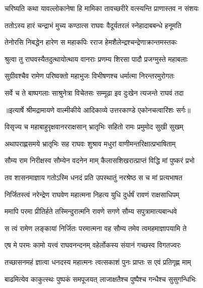 \twolineshloka
{चरिष्यति कथा यावल्लोकानेषा हि मामिका}
{तावच्छरीरे वत्स्यन्ति प्राणास्तव न संशयः} %

\twolineshloka
{ततोऽस्य हारं चन्द्राभं मुच्य कण्ठात्स राघवः}
{वैदूर्यतरलं स्नेहादाबबन्धे हनूमति} %

\twolineshloka
{तेनोरसि निबद्धेन हारेण स महाकपिः}
{रराज हेमशैलेन्द्रश्चन्द्रेणाक्रान्तमस्तकः} %

\twolineshloka
{श्रुत्वा तु राघवस्यैतदुत्थायोत्थाय वानराः}
{प्रणम्य शिरसा पादौ प्रजग्मुस्ते महाबलाः} %

\twolineshloka
{सुग्रीवश्चैव रामेण परिष्वक्तो महाभुजः}
{विभीषणश्च धर्मात्मा निरन्तरमुरोगतः} %

\twolineshloka
{सर्वे च ते बाष्पगलाः साश्रुनेत्रा विचेतसः}
{सम्मूढा इव दुःखेन त्यजन्ते राघवं तदा} %


{॥इत्यार्षे श्रीमद्रामायणे वाल्मीकीये आदिकाव्ये उत्तरकाण्डे एकोनचत्वारिंशः सर्गः॥}


\twolineshloka
{विसृज्य च महाबाहुरृक्षवानरराक्षसान्}
{भ्रातृभिः सहितो रामः प्रमुमोद सुखी सुखम्} %

\twolineshloka
{अथापराह्णसमये भ्रातृभिः सह राघवः}
{शुश्राव मधुरां वाणीमन्तरिक्षात्प्रभाषिताम्} %

\twolineshloka
{सौम्य राम निरीक्षस्व सौम्येन वदनेन माम्}
{कैलासशिखरात्प्राप्तं विद्धि मां पुष्करं प्रभो} %

\twolineshloka
{तव शासनमाज्ञाय गतोऽस्मि धनदं प्रति}
{उपस्थातुं नरश्रेष्ठ स च मां प्रत्यभाषत} %

\twolineshloka
{निर्जितस्त्वं नरेन्द्रेण राघवेण महात्मना}
{निहत्य युधि दुर्धर्षं रावणं राक्षसाधिपम्} %

\twolineshloka
{ममापि परमा प्रीतिर्हते तस्मिन्दुरात्मनि}
{रावणे सगणे सौम्य सपुत्रामात्यबान्धवे} %

\twolineshloka
{स त्वं रामेण लङ्कायां निर्जितः परमात्मना}
{वह सौम्य तमेव त्वमहमाज्ञापयामि ते} %

\twolineshloka
{एष मे परमः कामो यत्त्वं राघवनन्दनम्}
{वहेर्लोकस्य संयानं गच्छस्व विगतज्वरः} %

\twolineshloka
{तच्छासनमहं ज्ञात्वा धनदस्य महात्मनः}
{त्वत्सकाशं पुनः प्राप्तः स एवं प्रतिगृह्ण माम्} %

\twolineshloka
{बाढमित्येव काकुत्स्थः पुष्पकं समपूजयत्}
{लाजाक्षतैश्च पुष्पैश्च गन्धैश्च सुसुगन्धिभिः} %

